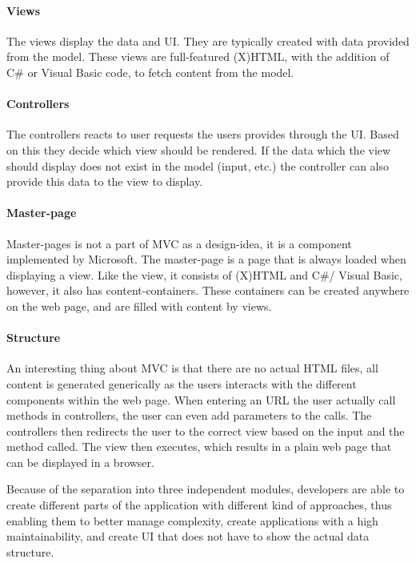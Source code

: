 \paragraph{Views}
The views display the data and UI. They are typically created with data provided from the model. These views are full-featured (X)HTML, with the addition of C\# or Visual Basic code, to fetch content from the model.

\paragraph{Controllers}
The controllers reacts to user requests the users provides through the UI. Based on this they decide which view should be rendered. If the data which the view should display does not exist in the model (input, etc.) the controller can also provide this data to the view to display.

\paragraph{Master-page}
Master-pages is not a part of MVC as a design-idea, it is a component implemented by Microsoft. The master-page is a page that is always loaded when displaying a view. Like the view, it consists of (X)HTML and C\#/ Visual Basic, however, it also has content-containers. These containers can be created anywhere on the web page, and are filled with content by views.

\paragraph{Structure}
An interesting thing about MVC is that there are no actual HTML files, all content is generated generically as the users interacts with the different components within the web page. When entering an URL the user actually call methods in controllers, the user can even add parameters to the calls. The controllers then redirects the user to the correct view based on the input and the method called. The view then executes, which results in a plain web page that can be displayed in a browser.

Because of the separation into three independent modules, developers are able to create different parts of the application with different kind of approaches, thus enabling them to better manage complexity, create applications with a high maintainability, and create UI that does not have to show the actual data structure.

